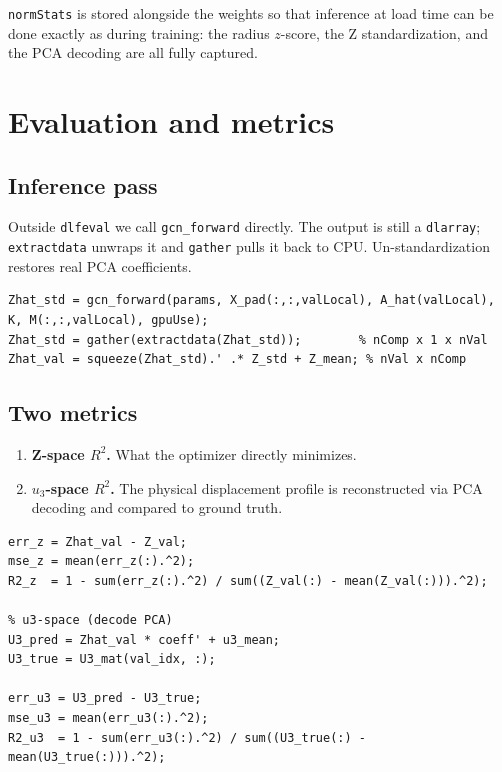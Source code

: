 \documentclass[11pt]{article}
\begin{document}
\texttt{normStats} is stored alongside the weights so that inference at load
time can be done exactly as during training: the radius $z$-score, the Z
standardization, and the PCA decoding are all fully captured.

\section{Evaluation and metrics}

\subsection{Inference pass}

Outside \texttt{dlfeval} we call \texttt{gcn\_forward} directly. The output
is still a \texttt{dlarray}; \texttt{extractdata} unwraps it and
\texttt{gather} pulls it back to CPU. Un-standardization restores real PCA
coefficients.

\begin{lstlisting}[caption={Validation inference + un-standardization}]
Zhat_std = gcn_forward(params, X_pad(:,:,valLocal), A_hat(valLocal), K, M(:,:,valLocal), gpuUse);
Zhat_std = gather(extractdata(Zhat_std));        % nComp x 1 x nVal
Zhat_val = squeeze(Zhat_std).' .* Z_std + Z_mean; % nVal x nComp
\end{lstlisting}

\subsection{Two metrics}

\begin{enumerate}[label=(\roman*)]
  \item \textbf{Z-space $R^2$.} What the optimizer directly minimizes.
  \item \textbf{$u_3$-space $R^2$.} The physical displacement profile is
        reconstructed via PCA decoding and compared to ground truth.
\end{enumerate}

\begin{lstlisting}[caption={Metrics}]
% Z-space
err_z = Zhat_val - Z_val;
mse_z = mean(err_z(:).^2);
R2_z  = 1 - sum(err_z(:).^2) / sum((Z_val(:) - mean(Z_val(:))).^2);

% u3-space (decode PCA)
U3_pred = Zhat_val * coeff' + u3_mean;
U3_true = U3_mat(val_idx, :);

err_u3 = U3_pred - U3_true;
mse_u3 = mean(err_u3(:).^2);
R2_u3  = 1 - sum(err_u3(:).^2) / sum((U3_true(:) - mean(U3_true(:))).^2);
\end{lstlisting}
\end{document}
